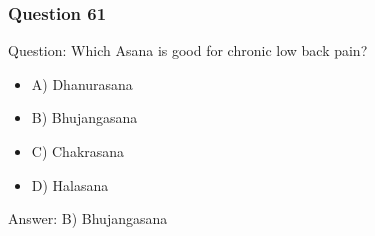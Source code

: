 \begin{frame}[fragile]\frametitle{Question 61}
Question: Which Asana is good for chronic low back pain?
\begin{itemize}
\item A) Dhanurasana
\item B) Bhujangasana
\item C) Chakrasana
\item D) Halasana
\end{itemize}
Answer: B) Bhujangasana
\end{frame}
